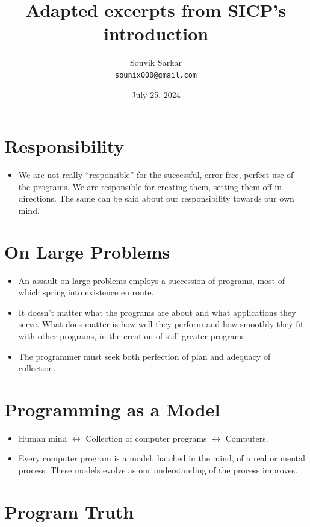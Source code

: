 \documentclass[12pt]{article}
\title{Adapted excerpts from SICP's introduction}
\author{Souvik Sarkar \\ \texttt{sounix000@gmail.com}} %
\date{July 25, 2024} %
\begin{document}
\maketitle

\section*{Responsibility}

\begin{itemize}[leftmargin=*]
    \item We are not really ``responsible'' for the successful, error-free, perfect use of the
    programs. We are responsible for creating them, setting them off in directions. The same
    can be said about our responsibility towards our own mind.
\end{itemize}

\section*{On Large Problems}

\begin{itemize}[leftmargin=*]
    \item An assault on large problems employs a succession of programs, most of which spring
    into existence en route.
    \item It doesn't matter what the programs are about and what applications they serve. What
    does matter is how well they perform and how smoothly they fit with other programs, in the
    creation of still greater programs.
    \item The programmer must seek both perfection of plan and adequacy of collection.
\end{itemize}

\section*{Programming as a Model}

\begin{itemize}[leftmargin=*]
    \item Human mind $\leftrightarrow$ Collection of computer programs $\leftrightarrow$ Computers.
    \item Every computer program is a model, hatched in the mind, of a real or mental process.
    These models evolve as our understanding of the process improves.
\end{itemize}

\section*{Program Truth}
\end{document}

